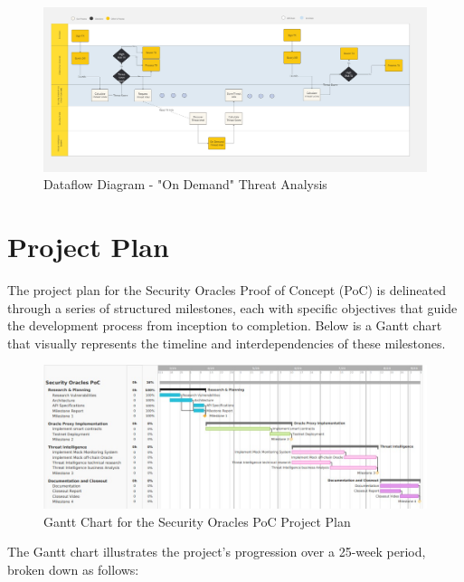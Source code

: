 \documentclass{scrreport}
\begin{document}
\begin{figure}[H]
\centering
\includegraphics[width=\textwidth]{Images/DataflowDiagramPull.jpg}
\caption{Dataflow Diagram - "On Demand" Threat Analysis}
\label{fig:dataflow_pull_diagram}
\end{figure}


\section{Project Plan}

The project plan for the Security Oracles Proof of Concept (PoC) is delineated through a series of structured milestones, each with specific objectives that guide the development process from inception to completion. Below is a Gantt chart that visually represents the timeline and interdependencies of these milestones.

\begin{figure}[H]
\centering
\includegraphics[width=\linewidth]{Images/Security Oracles - Project Plan.jpg}
\caption{Gantt Chart for the Security Oracles PoC Project Plan}
\label{fig:gantt_chart}
\end{figure}

The Gantt chart illustrates the project's progression over a 25-week period, broken down as follows:
\end{document}
